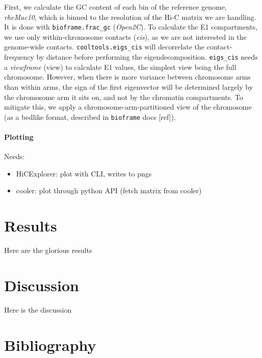 \documentclass[
  a4paper,
]{scrbook}
\providecommand{\tightlist}{%
  \setlength{\itemsep}{0pt}\setlength{\parskip}{0pt}}\usepackage{longtable,booktabs,array}
\let\oldemph\emph
\renewcommand\emph[1]{\oldemph{\color{gray}#1}}
\begin{document}
First, we calculate the GC content of each bin of the reference genome,
\emph{rheMac10}, which is binned to the resolution of the Hi-C matrix we
are handling. It is done with \texttt{bioframe.frac\_gc}
(\emph{Open2C}). To calculate the E1 compartments, we use only
within-chromosome contacts (\emph{cis}), as we are not interested in the
genome-wide contacts. \texttt{cooltools.eigs\_cis} will decorrelate the
contact-frequency by distance before performing the eigendecomposition.
\texttt{eigs\_cis} needs a \emph{viewframe} (view) to calculate E1
values, the simplest view being the full chromosome. However, when there
is more variance between chromosome arms than within arms, the sign of
the first eigenvector will be determined largely by the chromosome arm
it sits on, and not by the chromatin compartments. To mitigate this, we
apply a chromosome-arm-partitioned view of the chromosome (as a bedlike
format, described in \texttt{bioframe} docs {[}ref{]}).

\subsubsection{Plotting}\label{plotting}

Needs:

\begin{itemize}
\tightlist
\item
  HiCExplorer: plot with CLI, writes to pngs
\item
  cooler: plot through python API (fetch matrix from cooler)
\end{itemize}

\newpage{}

\chapter{Results}\label{results}

Here are the glorious results

\newpage{}

\chapter{Discussion}\label{discussion}

Here is the discussion

\newpage{}

\chapter*{Bibliography}\label{bibliography}
\end{document}
